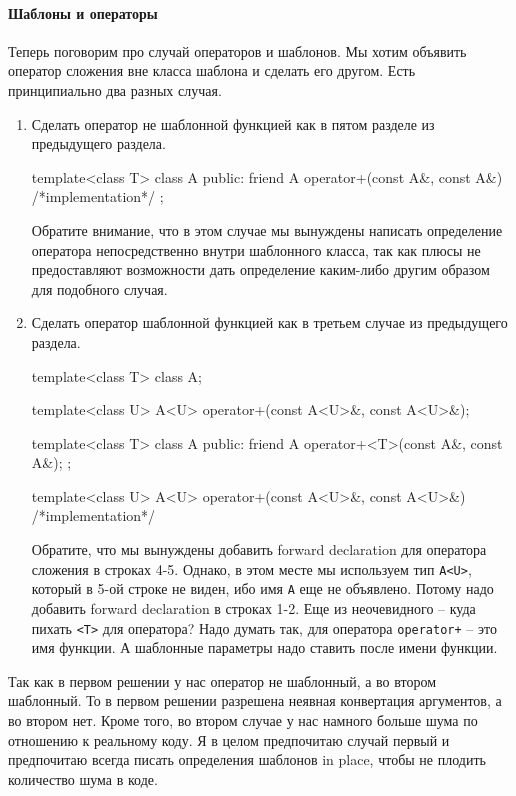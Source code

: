 \paragraph{Шаблоны и операторы}

Теперь поговорим про случай операторов и шаблонов.
Мы хотим объявить оператор сложения вне класса шаблона и сделать его другом.
Есть принципиально два разных случая.
\begin{enumerate}
\item Сделать оператор не шаблонной функцией как в пятом разделе из предыдущего раздела.
\begin{cppcode}
template<class T>
class A {
public:
  friend A operator+(const A&, const A&) {
    /*implementation*/
  }
};
\end{cppcode}
Обратите внимание, что в этом случае мы вынуждены написать определение оператора непосредственно внутри шаблонного класса, так как плюсы не предоставляют возможности дать определение каким-либо другим образом для подобного случая.

\item Сделать оператор шаблонной функцией как в третьем случае из предыдущего раздела.
\begin{cppcode}
template<class T>
class A;

template<class U>
A<U> operator+(const A<U>&, const A<U>&);

template<class T>
class A {
public:
  friend A operator+<T>(const A&, const A&);
};

template<class U>
A<U> operator+(const A<U>&, const A<U>&) {
  /*implementation*/
}
\end{cppcode}
Обратите, что мы вынуждены добавить forward declaration для оператора сложения в строках 4-5.
Однако, в этом месте мы используем тип \verb"A<U>", который в 5-ой строке не виден, ибо имя \verb"A" еще не объявлено.
Потому надо добавить forward declaration в строках 1-2.
Еще из неочевидного -- куда пихать \verb"<T>" для оператора?
Надо думать так, для оператора \verb"operator+" -- это имя функции.
А шаблонные параметры надо ставить после имени функции.
\end{enumerate}
Так как в первом решении у нас оператор не шаблонный, а во втором шаблонный.
То в первом решении разрешена неявная конвертация аргументов, а во втором нет.
Кроме того, во втором случае у нас намного больше шума по отношению к реальному коду.
Я в целом предпочитаю случай первый и предпочитаю всегда писать определения шаблонов in place, чтобы не плодить количество шума в коде.

